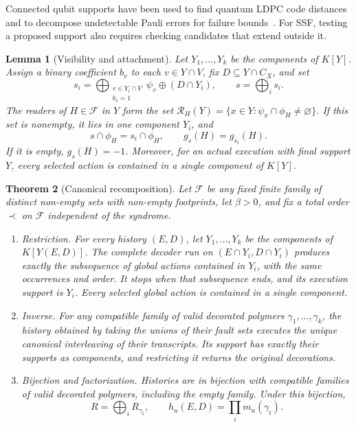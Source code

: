 \documentclass[10pt,twocolumn]{article}
\newtheorem{theorem}{Theorem}
\newtheorem{lemma}[theorem]{Lemma}
\theoremstyle{definition}
\newcommand{\FF}{\mathcal{F}}
\begin{document}
Connected qubit supports have been used to find quantum LDPC code
distances~\cite{KDP13} and to decompose undetectable Pauli errors for
failure bounds~\cite[Lemma~4]{DKP15}. For SSF, testing a proposed
support also requires checking candidates that extend outside it.

\begin{lemma}[Visibility and attachment]\label{lem:visibility}
Let $Y_1,\ldots,Y_k$ be the components of $K[Y]$. Assign a binary
coefficient $b_v$ to each $v\in Y\cap V$, fix $D\subseteq Y\cap C_X$, and set
\[
 s_i=\bigoplus_{\substack{v\in Y_i\cap V\\b_v=1}}\psi_v
       \oplus(D\cap Y_i),\qquad s=\bigoplus_i s_i.
\]
The readers of $H\in\FF$ in $Y$ form the set
$\mathcal R_H(Y)=\{x\in Y:\psi_x\cap\phi_H\ne\varnothing\}$.
If this set is nonempty, it lies in one component $Y_i$, and
\[
 s\cap\phi_H=s_i\cap\phi_H,\qquad g_s(H)=g_{s_i}(H).
\]
If it is empty, $g_s(H)=-1$. Moreover, for an actual execution with final
support $Y$, every selected action is contained in a single component of
$K[Y]$.
\end{lemma}

\begin{theorem}[Canonical recomposition]\label{thm:recomp}
Let $\FF$ be any fixed finite family of distinct non-empty sets with
non-empty footprints, let $\beta>0$, and fix a total order $\prec$ on
$\FF$ independent of the syndrome.
\begin{enumerate}
\item[(i)] \emph{Restriction.} For every history $(E,D)$, let
$Y_1,\ldots,Y_k$ be the components of $K[Y(E,D)]$. The complete decoder
run on $(E\cap Y_i,D\cap Y_i)$ produces exactly the subsequence of global
actions contained in $Y_i$, with the same occurrences and order. It stops
when that subsequence ends, and its execution support is $Y_i$.
Every selected global action is contained in a single component.
\item[(ii)] \emph{Inverse.} For any compatible family of valid decorated
polymers $\gamma_1,\ldots,\gamma_k$, the history obtained by taking the
unions of their fault sets executes the unique canonical interleaving of
their transcripts. Its support has exactly their supports as components,
and restricting it returns the original decorations.
\item[(iii)] \emph{Bijection and factorization.} Histories are in bijection
with compatible families of valid decorated polymers, including the
empty family. Under this bijection,
\[
 R=\bigoplus_i R_{\gamma_i},\qquad
 h_u(E,D)=\prod_i m_u(\gamma_i).
\]
\end{enumerate}
\end{theorem}
\end{document}
